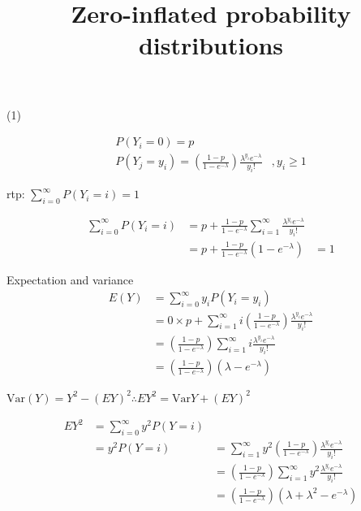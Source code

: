\documentclass{amsart}
\title{Zero-inflated probability distributions}
\def\Var{\text{Var}}
\begin{document}
\maketitle

(1)

\begin{equation*}
\begin{array}{ll}
P(Y_i = 0) = p & \\
P(Y_j = y_i) = \left (\frac{1 - p}{1 - e^{-\lambda}}\right ) \frac{\lambda^{y_i} e^{-\lambda}}{y_i !} &, y_i \geq 1
\end{array}
\end{equation*}

rtp: $\sum_{i=0}^{\infty} P(Y_i = i) = 1$

\begin{equation*}
\begin{array}{lll}
\sum_{i=0}^{\infty} P(Y_i = i) &= p + \frac{1-p}{1 - e^{-\lambda}} \sum_{i=1}^{\infty} \frac{\lambda^{y_i} e^{-\lambda}}{y_i !} & \\
&= p + \frac{1 - p}{1 - e^{-\lambda}} (1 - e^{-\lambda}) &= 1
\end{array}
\end{equation*}

Expectation and variance
\begin{equation*}
\begin{array}{ll}
E(Y) &= \sum_{i=0}^{\infty} y_i P(Y_i = y_i) \\
&= 0 \times p + \sum_{i=1}^{\infty} i \left( \frac{1 - p}{1 - e^{-\lambda}} \right) \frac{\lambda^{y_i} e^{-\lambda}}{y_i !} \\
&= \left( \frac{1 - p}{1 - e^{-\lambda}} \right) \sum_{i=1}^{\infty} i \frac{\lambda^{y_i} e^{-\lambda}}{y_i !} \\
&= \left( \frac{1 - p}{1 - e^{-\lambda}} \right) (\lambda - e^{-\lambda})
\end{array}
\end{equation*}

$\Var(Y) = Y^2 - (EY)^2 \therefore E Y^2 = \Var Y + (E Y)^2$

\begin{equation*}
\begin{array}{lll}
E Y^2 &= \sum_{i=0}^{\infty} y^2 P(Y=i) & \\
&= y^2 P(Y=i) &= \sum_{i=1}^{\infty} y^2 \left( \frac{1 - p}{1 - e^{-\lambda}} \right) \frac{\lambda^{y_i} e^{-\lambda}}{y_i !} \\
&&= \left( \frac{1 - p}{1 - e^{-\lambda}} \right) \sum_{i=1}^{\infty}  y^2 \frac{\lambda^{y_i} e^{-\lambda}}{y_i !} \\
&&= \left( \frac{1 - p}{1 - e^{-\lambda}} \right) (\lambda + \lambda^2 - e^{-\lambda})
\end{array}
\end{equation*}
\end{document}
